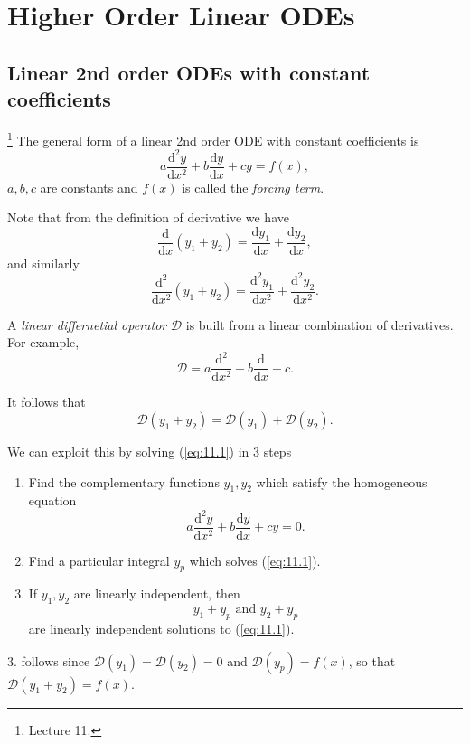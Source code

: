 \documentclass[a4paper]{article}
\begin{document}
    \section{Higher Order Linear ODEs}
    \subsection{Linear 2nd order ODEs with constant coefficients}\footnote{Lecture 11.}
    The general form of a linear 2nd order ODE with constant coefficients is 
    \begin{equation}\label{eq:11.1}
        a \frac{\mathrm{d}^2y}{\mathrm{d}x^2}+b \frac{\mathrm{d}y}{\mathrm{d}x}+cy = f(x),
    \end{equation}
    $a,b,c$ are constants and $f(x)$ is called the \textit{forcing term}.

    Note that from the definition of derivative we have 
    \[
        \frac{\mathrm{d}}{\mathrm{d}x}(y_1+y_2)=\frac{\mathrm{d}y_1}{\mathrm{d}x}+\frac{\mathrm{d}y_2}{\mathrm{d}x},   
    \]
    and similarly
    \[
        \frac{\mathrm{d}^2}{\mathrm{d}x^2}(y_1+y_2)=\frac{\mathrm{d}^2y_1}{\mathrm{d}x^2}+\frac{\mathrm{d}^2y_2}{\mathrm{d}x^2}
    .\]

    \begin{definition}
        A \textit{linear differnetial operator} $ \mathcal{D} $ is built from a linear combination of derivatives. For example,
    \[
        \mathcal{D} = a\frac{\mathrm{d}^2}{\mathrm{d}x^2}+b \frac{\mathrm{d}}{\mathrm{d}x}+c.
    \]
    \end{definition}
    It follows that 
    \[
        \mathcal{D}(y_1+y_2)=\mathcal{D}(y_1)+\mathcal{D}(y_2)
    .\]

    We can exploit this by solving (\ref{eq:11.1}) in 3 steps
    \begin{enumerate}
        \item Find the complementary functions $y_1,y_2$ which satisfy the homogeneous equation
        \begin{equation}\label{eq:11.2}
            a \frac{\mathrm{d}^2y}{\mathrm{d}x^2}+b \frac{\mathrm{d}y}{\mathrm{d}x}+cy = 0.
        \end{equation}
        \item Find a particular integral $y_p$ which solves (\ref{eq:11.1}).
        \item If $y_1,y_2$ are linearly independent, then 
        \[y_1+y_p\text{ and }y_2+y_p\]
        are linearly independent solutions to (\ref{eq:11.1}).
    \end{enumerate}
    3. follows since $ \mathcal{D}(y_1)=\mathcal{D}(y_2)=0 $ and $ \mathcal{D}(y_p)=f(x) $, so that $ \mathcal{D}(y_1+y_2)=f(x) $.
\end{document}
